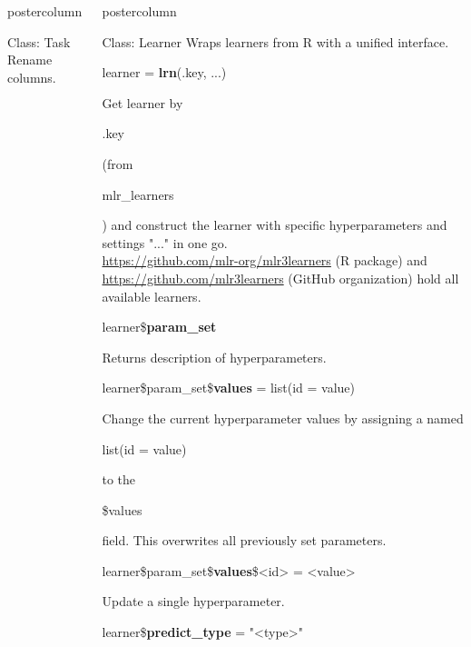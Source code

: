 \documentclass{beamer}
\newlength{\columnheight} %
\newcommand{\codeinline}[1]{\begin{codeboxinline}#1\end{codeboxinline}}
\begin{document}
\begin{frame}[fragile]{}
\begin{columns}
\begin{column}{.245\textwidth}
\begin{beamercolorbox}[center]{postercolumn}
\begin{minipage}{.98\textwidth}
{\begin{myblock}{Class: Task}
							Rename columns.
						\end{myblock}
						\vfill}
				\end{minipage}
			\end{beamercolorbox}
		\end{column}
		\begin{column}{.245\textwidth}
			\begin{beamercolorbox}[center]{postercolumn}
				\begin{minipage}{.98\textwidth}
					\parbox[t][\columnheight]{\textwidth}{
						\begin{myblock}{Class: Learner}
							Wraps learners from R with a unified interface.
							\\
							\begin{codebox}
								learner = \textbf{lrn}(.key, ...)
							\end{codebox}
							Get learner by \codeinline{.key} (from \codeinline{mlr\_learners})
							and construct the learner with specific hyperparameters and settings "..." in one go.
							\\
							\href{https://github.com/mlr-org/mlr3learners}{https://github.com/mlr-org/mlr3learners} (R package) and \href{https://github.com/mlr3learners}{https://github.com/mlr3learners} (GitHub organization) hold all available learners.
							\\
							\begin{codebox}
								learner\$\textbf{param\_set}
							\end{codebox}
							Returns description of hyperparameters.
							\\
							\begin{codebox}
								learner\$param\_set\$\textbf{values} = list(id = value)
							\end{codebox}
							Change the current hyperparameter values by assigning a named \codeinline{list(id = value)} to the \codeinline{\$values} field.
							This overwrites all previously set parameters.
							\\
							\begin{codebox}
								learner\$param\_set\$\textbf{values}\$<id> = <value>
							\end{codebox}
							Update a single hyperparameter.
							\vspace{1em}
							\\
							\begin{codebox}
								learner\$\textbf{predict\_type} = "<type>"
							\end{codebox}

\end{myblock}}
\end{minipage}
\end{beamercolorbox}
\end{column}
\end{columns}
\end{frame}
\end{document}
